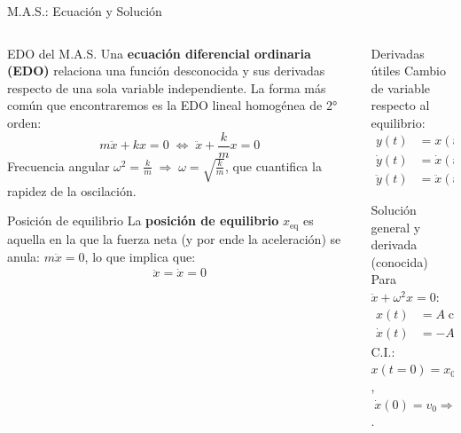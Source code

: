 \documentclass[
    10pt,
    aspectratio=169,
    xcolor={dvipsnames},
    spanish,
    ]{beamer}
\begin{document}
\begin{frame}{M.A.S.: Ecuación y Solución}
  \footnotesize
  \begin{columns}[T]
    \begin{column}{0.58\textwidth}
      \begin{block}{EDO del M.A.S.}
        Una \textbf{ecuación diferencial ordinaria (EDO)} relaciona una función   desconocida y sus derivadas respecto de una sola variable independiente. La forma más común que encontraremos es la EDO lineal homogénea de 2° orden:
        \begin{equation*}
          m\ddot x + kx = 0 \;\Longleftrightarrow\; \ddot x + \frac{k}{m}x = 0
        \end{equation*}
        \noindent Frecuencia angular $\omega^2=\tfrac{k}{m} \;\Rightarrow\; \omega=\sqrt{\tfrac{k}{m}}$, que cuantifica la rapidez de la oscilación.\vspace{-2pt}
      \end{block}
      \begin{block}{Posición de equilibrio}
        La \textbf{posición de equilibrio} $x_{\text{eq}}$ es aquella en la que la fuerza neta (y por ende la aceleración) se anula: $m\ddot x=0$, lo que implica que:\begin{align}
          \ddot{x}= \dot{x} = 0
        \end{align}
      \end{block}
    \end{column}
    \begin{column}{0.45\textwidth}
      \begin{block}{Derivadas útiles}
        Cambio de variable respecto al equilibrio:\\[-2pt]
        \[
          \begin{aligned}
            y(t) &= x(t)-x_{\text{eq}},\\
            \dot y(t) &= \dot x(t),\\
            \ddot y(t) &= \ddot x(t).
          \end{aligned}
        \]
      \end{block}
      \begin{block}{Solución general y derivada (conocida)}
        Para $\ddot x + \omega^2 x=0$:
        \[
          \begin{aligned}
            x(t) &= A\cos(\omega t)+B\sin(\omega t),\\
            \dot x(t) &= -A\omega\sin(\omega t)+B\omega\cos(\omega t).
          \end{aligned}
        \]
        C.I.: $x(t= 0)=x_0 \Rightarrow A=x_0$, $\;\dot x(0)=v_0 \Rightarrow B=v_0/\omega$.
      \end{block}
    \end{column}
  \end{columns}
\end{frame}
\end{document}
